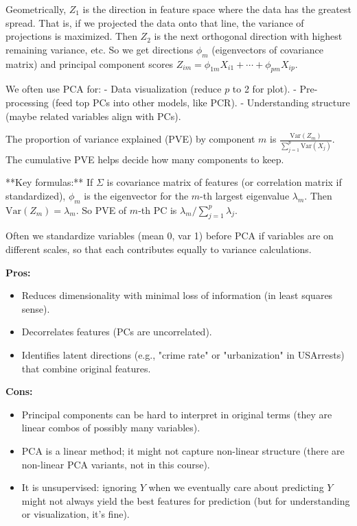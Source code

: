 \documentclass[11pt]{article}
\begin{document}
Geometrically, $Z_1$ is the direction in feature space where the data has the greatest spread. That is, if we projected the data onto that line, the variance of projections is maximized. Then $Z_2$ is the next orthogonal direction with highest remaining variance, etc. So we get directions $\phi_m$ (eigenvectors of covariance matrix) and principal component scores $Z_{im} = \phi_{1m}X_{i1}+\cdots+\phi_{pm}X_{ip}$.

We often use PCA for:
- Data visualization (reduce $p$ to 2 for plot).
- Pre-processing (feed top PCs into other models, like PCR).
- Understanding structure (maybe related variables align with PCs).

The proportion of variance explained (PVE) by component $m$ is $\frac{\text{Var}(Z_m)}{\sum_{j=1}^p \text{Var}(X_j)}$. The cumulative PVE helps decide how many components to keep.

**Key formulas:**
If $\Sigma$ is covariance matrix of features (or correlation matrix if standardized), $\phi_m$ is the eigenvector for the $m$-th largest eigenvalue $\lambda_m$. Then $\text{Var}(Z_m) = \lambda_m$. So PVE of $m$-th PC is $\lambda_m/\sum_{j=1}^p \lambda_j$.

Often we standardize variables (mean 0, var 1) before PCA if variables are on different scales, so that each contributes equally to variance calculations.

\noindent \textbf{Pros:}
\begin{itemize}
    \item Reduces dimensionality with minimal loss of information (in least squares sense).
    \item Decorrelates features (PCs are uncorrelated).
    \item Identifies latent directions (e.g., "crime rate" or "urbanization" in USArrests) that combine original features.
\end{itemize}

\noindent \textbf{Cons:}
\begin{itemize}
    \item Principal components can be hard to interpret in original terms (they are linear combos of possibly many variables).
    \item PCA is a linear method; it might not capture non-linear structure (there are non-linear PCA variants, not in this course).
    \item It is unsupervised: ignoring $Y$ when we eventually care about predicting $Y$ might not always yield the best features for prediction (but for understanding or visualization, it's fine).
\end{itemize}
\end{document}
